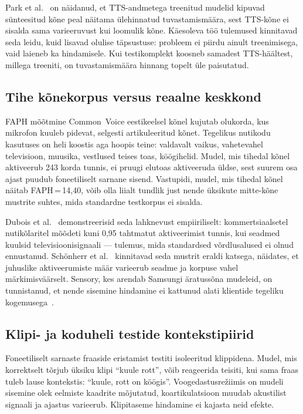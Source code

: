 Park et al.~\cite{park2024adversarial} on näidanud, et TTS-andmetega treenitud mudelid kipuvad sünteesitud kõne peal näitama ülehinnatud tuvastamismäära, sest TTS-kõne ei sisalda sama varieeruvust kui loomulik kõne. Käesoleva töö tulemused kinnitavad seda leidu, kuid lisavad olulise täpsustuse: probleem ei piirdu ainult treenimisega, vaid laieneb ka hindamisele. Kui testikomplekt koosneb samadest TTS-häältest, millega treeniti, on tuvastamismäära hinnang topelt üle paisutatud.

\subsection{Tihe kõnekorpus versus reaalne keskkond}

FAPH mõõtmine Common~Voice eestikeelsel kõnel kujutab olukorda, kus mikrofon kuuleb pidevat, selgesti artikuleeritud kõnet. Tegelikus nutikodu kasutuses on heli koostis aga hoopis teine: valdavalt vaikus, vahetevahel televisioon, muusika, vestlused teises toas, köögihelid. Mudel, mis tihedal kõnel aktiveerub 243 korda tunnis, ei pruugi elutoas aktiveeruda üldse, sest suurem osa ajast puudub foneetiliselt sarnane sisend. Vastupidi, mudel, mis tihedal kõnel näitab FAPH\,=\,14,40, võib olla liialt tundlik just nende üksikute mitte-kõne mustrite suhtes, mida standardne testkorpus ei sisalda.

Dubois et al.~\cite{dubois2020triggers} demonstreerisid seda lahknevust empiiriliselt: kommertsiaalsetel nutikõlaritel mõõdeti kuni 0,95 tahtmatut aktiveerimist tunnis, kui seadmed kuulsid televisioonisignaali --- tulemus, mida standardsed võrdlusalused ei olnud ennustanud. Sch{\"o}nherr et al.~\cite{schoenherr2022accidental} kinnitavad seda mustrit eraldi katsega, näidates, et juhuslike aktiveerumiste määr varieerub seadme ja korpuse vahel märkimisväärselt. Sensory, kes arendab Samsungi äratussõna mudeleid, on tunnistanud, et nende sisemine hindamine ei kattunud alati klientide tegeliku kogemusega~\cite{sensory2024realworld}.

\subsection{Klipi- ja koduheli testide kontekstipiirid}

Foneetiliselt sarnaste fraaside eristamist testiti isoleeritud klippidena. Mudel, mis korrektselt tõrjub üksiku klipi \enquote{kuule rott}, võib reageerida teisiti, kui sama fraas tuleb lause kontekstis: \enquote{kuule, rott on köögis}. Voogedastusrežiimis on mudeli sisemine olek eelmiste kaadrite mõjutatud, koartikulatsioon muudab akustilist signaali ja ajastus varieerub. Klipitaseme hindamine ei kajasta neid efekte.

